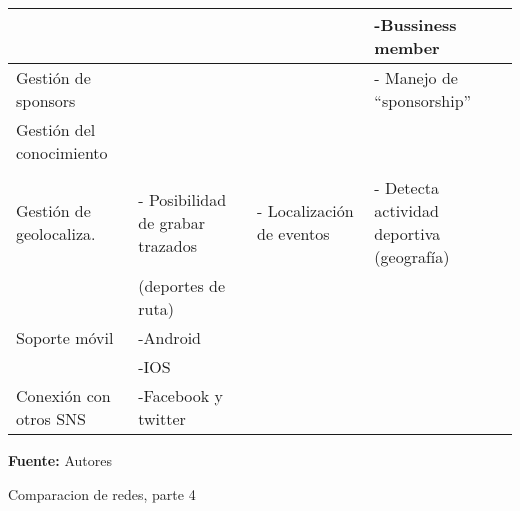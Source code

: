 \begin{landscape}
\begin{table}
\begin{center}
{\begin{tabular}{|p{4cm}|p{7cm}p{6cm}p{9cm}|}
 &  &  & -Bussiness member \\ 
\hline
Gestión de sponsors &  &  & - Manejo de ``sponsorship'' \\ 
\hline
Gestión del conocimiento &  &  &  \\ 
 &  &  &  \\ 
\hline
Gestión de geolocaliza. & - Posibilidad de grabar trazados & - Localización de eventos & - Detecta actividad deportiva (geografía) \\ 
 & (deportes de ruta) &  &  \\ 
\hline
Soporte móvil & -Android &  &  \\ 
 & -IOS &  &  \\ 
\hline
Conexión con otros SNS & -Facebook y twitter &  &  \\
\hline
\end{tabular}
}
  \textbf{Fuente:} Autores
  \end{center}
\end{table}

\newpage

\begin{table}
  \caption{Comparacion de redes, parte 4}
  \label{tab:comparacion_redes_4}

  \begin{center}
  

\end{center}
\end{table}
\end{landscape}
